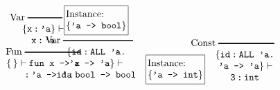 \documentclass{article}
\begin{document}
$$\hspace*{-1.5in}
\begin{array}{c}
  \begin{array}[b]{c}
    \hspace*{-.2in}\mbox{Var}\;\rule[2pt]{.5in}{1pt}\\
    \{\texttt{x\,:\,'a}\}\vdash\\ \texttt{x\,:\,'a}\\
  \mbox{Fun}\;\rule[2pt]{.8in}{1pt}\\
  \{\,\}\vdash \texttt{fun x -> x}\\
  \texttt{\quad:\,'a -> 'a}
  \end{array}%
  \hspace*{-2em}
  \begin{array}[b]{c}\hspace*{-2em}
    \begin{array}[b]{c}
    \fbox{\hspace*{-1.7ex}\begin{tabular}{l}Instance:\\
        $\{\texttt{'a -> bool}\}$\end{tabular}\hspace*{-1.7ex}}\\
    \hspace*{-.2in}\mbox{Var}\;\rule[2pt]{1in}{1pt}\\
    \{\texttt{id\,:\,ALL 'a.}\\
    \texttt{'a -> 'a}\}\vdash\\
    \texttt{id\,:\,bool -> bool}
  \end{array}%
  \begin{array}[b]{c}
    \fbox{\hspace*{-1.7ex}\begin{tabular}[b]{l}Instance:\\
        $\{\texttt{'a -> int}\}$\\\end{tabular}\hspace*{-1.7ex}}
    \;\;
    \begin{array}[b]{c}
      \hspace*{-.35in}\mbox{Const}\;\rule[2pt]{.8in}{1pt}\\
      \{\texttt{id\,:\,ALL 'a.}\\
      \texttt{\,'a -> 'a}\}\vdash\\
      \texttt{3\,:\,int}\\[-1.5ex]
    \end{array}
    \quad
\begin{array}[b]{c}

\end{array}
\end{array}
\end{array}
\end{array}$$
\end{document}
